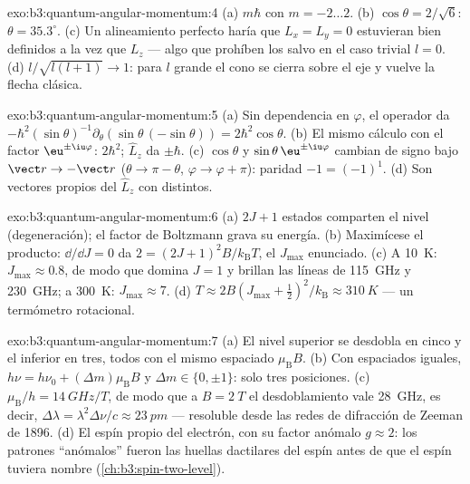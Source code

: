 \begin{solution}{exo:b3:quantum-angular-momentum:4}
(a) $m\hbar$ con $m = -2 \dots 2$. (b) $\cos\theta = 2/\sqrt6$:
$\theta = 35.3^\circ$. (c) Un alineamiento perfecto haría que $L_x = L_y
= 0$ estuvieran bien definidos a la vez que $L_z$ --- algo que prohíben los
 salvo en el caso trivial $l = 0$. (d) $l/\sqrt{l(l+1)} \to 1$:
para $l$ grande el cono se cierra sobre el eje y vuelve la flecha clásica.
\end{solution}

\begin{solution}{exo:b3:quantum-angular-momentum:5}
(a) Sin dependencia en $\varphi$, el operador da
$-\hbar^2(\sin\theta)^{-1}\partial_\theta(\sin\theta\,(-\sin\theta))
= 2\hbar^2\cos\theta$. (b) El mismo cálculo con el factor
$\eu^{\pm\iu\varphi}$:  $2\hbar^2$; $\hat L_z$
da $\pm\hbar$. (c) $\cos\theta$ y $\sin\theta\,\eu^{\pm\iu
\varphi}$ cambian de signo bajo $\vect r \to -\vect r$ ($\theta \to \pi
- \theta$, $\varphi \to \varphi + \pi$): paridad $-1 = (-1)^1$. (d)
Son vectores propios del  $\hat L_z$ con 
distintos.
\end{solution}

\begin{solution}{exo:b3:quantum-angular-momentum:6}
(a) $2J + 1$ estados comparten el nivel (degeneración); el factor de
Boltzmann grava su energía. (b) Maximícese el producto: $\dd/\dd J = 0$
da $2 = (2J+1)^2B/k_{\text{B}}T$, el $J_{\max}$ enunciado. (c) A
\qty{10}{K}: $J_{\max} \approx 0.8$, de modo que domina $J = 1$ y brillan
las líneas de \qty{115}{GHz} y \qty{230}{GHz}; a \qty{300}{K}:
$J_{\max} \approx 7$. (d) $T \approx 2B(J_{\max} + \tfrac12)^2/
k_{\text{B}} \approx \qty{310}{K}$ --- un termómetro rotacional.
\end{solution}

\begin{solution}{exo:b3:quantum-angular-momentum:7}
(a) El nivel superior se desdobla en cinco y el inferior en tres, todos
con el mismo espaciado $\mu_{\text{B}}B$. (b) Con espaciados iguales,
$h\nu = h\nu_0 + (\Delta m)\mu_{\text{B}}B$ y $\Delta m \in \{0,
\pm1\}$: solo tres posiciones. (c) $\mu_{\text{B}}/h = \qty{14}{GHz/T}$, de modo que a $B = \qty{2}{T}$
el desdoblamiento vale \qty{28}{GHz}, es decir, $\Delta\lambda =
\lambda^2\Delta\nu/c \approx \qty{23}{pm}$ --- resoluble desde las redes de
difracción de Zeeman de 1896.
(d) El espín propio del electrón, con su factor anómalo $g \approx
2$: los patrones ``anómalos'' fueron las huellas dactilares del espín antes
de que el espín tuviera nombre (\cref{ch:b3:spin-two-level}).
\end{solution}

